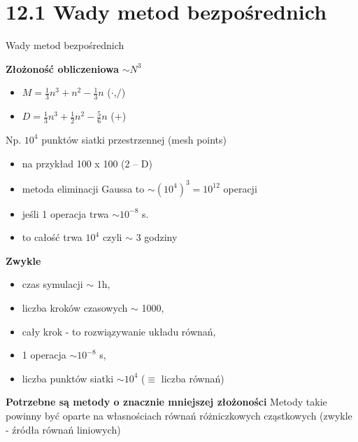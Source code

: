 \section{12.1 Wady metod bezpośrednich}

\begin{frame}{Wady metod bezpośrednich}
  \begin{block}{\textbf{Złożoność obliczeniowa} ${\sim}N^3$}
    \begin{itemize}
      \item{ $M=\frac{1}{3}n^3+n^2-\frac{1}{3}n$ ($\cdot$,$/$)}
      \item{ $D=\frac{1}{3}n^3+\frac{1}{2}n^2-\frac{5}{6}n$ ($+$)}
    \end{itemize}
    Np. $10^4$ punktów siatki przestrzennej (mesh points)
    \begin{itemize}
      \item{ na przykład 100 x 100   (2 -- D)}
      \item{metoda eliminacji Gaussa to $\sim (10^4)^3=10^{12}$ operacji}
      \item{jeśli 1 operacja trwa $\sim 10^{-8}$ s.}
      \item{to całość trwa $10^4$ czyli $\sim$ 3 godziny}
    \end{itemize}
  \end{block}
\end{frame}

\begin{frame}{}
  \begin{block}{\textbf{Zwykle}}
    \begin{itemize}
      \item{czas symulacji $\sim$ 1h,}
      \item{liczba kroków czasowych $\sim$ 1000,}
      \item{cały krok - to rozwiązywanie układu równań,}
      \item{1 operacja $\sim 10^{-8}$ s,}
      \item{liczba punktów siatki $\sim 10^4$ ($\equiv$ liczba równań)}
    \end{itemize}
  \end{block}
  \begin{block}{\textbf{Potrzebne są metody o znacznie mniejszej złożoności}}
   Metody takie powinny być oparte na własnościach równań różniczkowych cząstkowych (zwykle - źródła równań liniowych)
\end{block}
\end{frame}

